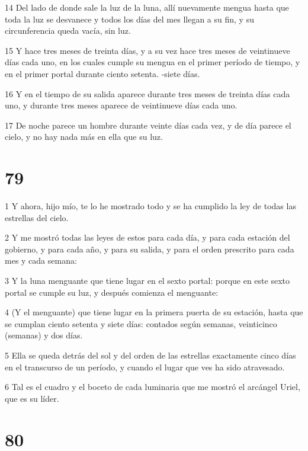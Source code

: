 \par 14 Del lado de donde sale la luz de la luna, allí nuevamente mengua hasta que toda la luz se desvanece y todos los días del mes llegan a su fin, y su circunferencia queda vacía, sin luz.
\par 15 Y hace tres meses de treinta días, y a su vez hace tres meses de veintinueve días cada uno, en los cuales cumple su mengua en el primer período de tiempo, y en el primer portal durante ciento setenta. -siete días.
\par 16 Y en el tiempo de su salida aparece durante tres meses de treinta días cada uno, y durante tres meses aparece de veintinueve días cada uno.
\par 17 De noche parece un hombre durante veinte días cada vez, y de día parece el cielo, y no hay nada más en ella que su luz.

\chapter{79}

\par 1 Y ahora, hijo mío, te lo he mostrado todo y se ha cumplido la ley de todas las estrellas del cielo.
\par 2 Y me mostró todas las leyes de estos para cada día, y para cada estación del gobierno, y para cada año, y para su salida, y para el orden prescrito para cada mes y cada semana:
\par 3 Y la luna menguante que tiene lugar en el sexto portal: porque en este sexto portal se cumple su luz, y después comienza el menguante:
\par 4 (Y el menguante) que tiene lugar en la primera puerta de su estación, hasta que se cumplan ciento setenta y siete días: contados según semanas, veinticinco (semanas) y dos días.
\par 5 Ella se queda detrás del sol y del orden de las estrellas exactamente cinco días en el transcurso de un período, y cuando el lugar que ves ha sido atravesado.
\par 6 Tal es el cuadro y el boceto de cada luminaria que me mostró el arcángel Uriel, que es su líder.

\chapter{80}

